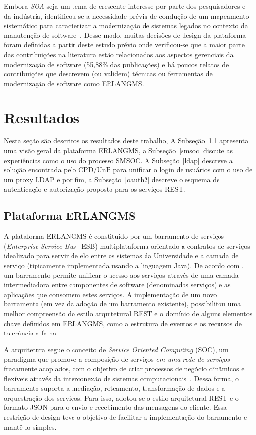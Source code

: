 \documentclass[12pt]{article}
\begin{document}
Embora \emph{SOA} seja um tema
de crescente interesse por parte dos pesquisadores e da indústria, identificou-se 
a necessidade prévia de condução de um mapeamento sistemático para 
caracterizar a modernização de sistemas legados no 
contexto da manutenção de software~\cite{desystematic2016}. 
Desse modo, muitas decisões de design da plataforma
foram definidas a partir deste estudo prévio onde verificou-se
que a maior parte das contribuições na literatura
estão relacionados aos aspectos gerenciais da modernização de software (55,88\% das
publicações) e há poucos relatos de contribuições que descrevem (ou validem)
técnicas ou ferramentas de modernização de software como ERLANGMS.


\section{Resultados}

Nesta seção são descritos os resultados deste trabalho, A Subseção~\ref{plataforma}
apresenta uma visão geral da plataforma ERLANGMS, a Subseção~\ref{smsoc}
discute as experiências como o uso do processo SMSOC. A Subseção~\ref{ldap}
descreve a solução encontrada pelo CPD/UnB para unificar
o login de usuários com o uso de um proxy LDAP e por fim, 
a Subseção~\ref{oauth2}
descreve o esquema de autenticação e autorização proposto 
para os serviços REST.


\subsection{Plataforma ERLANGMS}\label{plataforma}

A plataforma ERLANGMS é constituído 
por um barramento de serviços (\textit{Enterprise Service Bus}-- ESB) 
multiplataforma orientado a contratos de serviços
idealizado para servir de elo entre os 
sistemas da Universidade e a camada de serviço (tipicamente 
implementada usando a linguagem Java). 
De acordo com \cite{ModelDriApproRest:2014}, 
um barramento permite unificar o acesso aos serviços 
através de uma camada intermediadora entre componentes de software (denominados serviços) e 
as aplicações que consomem estes serviços. 
A implementa\c c\~{a}o 
de um novo barramento (em vez da ado\c c\~{a}o de um barramento existente), 
possibilitou uma melhor compreens\~{a}o do estilo arquitetural REST e o dom\'{i}nio de alguns 
elementos chave definidos em ERLANGMS, como a estrutura de eventos
e os recursos de toler\^{a}ncia a falha. 

A arquitetura segue o conceito de \textit{Service Oriented Computing} (SOC), 
um paradigma que promove a composição de serviços \emph{em uma rede de serviços} 
fracamente acoplados, com o objetivo de criar processos de negócio dinâmicos 
e flexíveis através da interconexão de sistemas computacionais~\cite{ModelDriApproRest:2014}. 
Dessa forma, o barramento suporta a mediação, roteamento, 
transformação de dados e a orquestração dos serviços. Para isso, adotou-se o 
estilo arquitetural REST e o formato JSON para o envio e 
recebimento das mensagens do cliente. Essa restrição de design teve o 
objetivo de facilitar a implementação do barramento e mantê-lo simples. 
\end{document}
